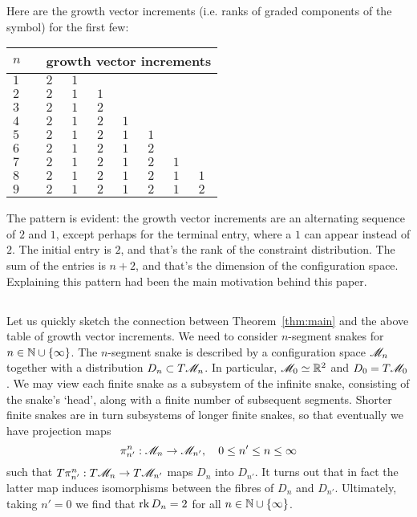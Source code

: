 Here are the growth vector increments (i.e. ranks of graded
components of the symbol) for the first few:
\begin{center}\begin{tabular}{@{}lclllllll@{}}
        $n$ & & \multicolumn{7}{c}{growth vector increments} \\
        \midrule
        $1$ & & $2$ & $1$ \\
        $2$ & & $2$ & $1$ & $1$ \\
        $3$ & & $2$ & $1$ & $2$ \\
        $4$ & & $2$ & $1$ & $2$ & $1$ \\
        $5$ & & $2$ & $1$ & $2$ & $1$ & $1$ \\
        $6$ & & $2$ & $1$ & $2$ & $1$ & $2$ \\
        $7$ & & $2$ & $1$ & $2$ & $1$ & $2$ & $1$ \\
        $8$ & & $2$ & $1$ & $2$ & $1$ & $2$ & $1$ & $1$\\
        $9$ & & $2$ & $1$ & $2$ & $1$ & $2$ & $1$ & $2$ \\
\end{tabular}
\end{center}
The pattern is evident: the growth vector increments are an alternating
sequence of $2$ and $1$, except perhaps for the terminal entry, where
a $1$ can appear instead of $2$. The initial entry is $2$, and that's the rank
of the constraint distribution. The sum of the entries is $n+2$, and that's the
dimension of the configuration space. Explaining this pattern had been the main
motivation behind this paper.

\subsection{}
Let us quickly sketch the connection between Theorem~\ref{thm:main} and the above table
of growth vector increments. We need to consider $n$-segment snakes for $n \in {\mathbb{N}} \cup \{\infty\}$.
The $n$-segment snake is described by a configuration space $\mathscr{M}_n$ together with a distribution
$D_n \subset T\mathscr{M}_n$. In particular, $\mathscr{M}_0 \simeq {\mathbb{R}}^2$ and $D_0 = T\mathscr{M}_0$.
We may view each finite snake as a subsystem of the infinite snake,
consisting of the snake's `head', along with a finite number of subsequent segments. Shorter finite
snakes are in turn subsystems of longer finite snakes, so that eventually we have projection maps
\[ \pi^n_{n'} : \mathscr{M}_n \to \mathscr{M}_{n'},\quad 0 \le n' \le n \le \infty \]
such that $T\pi^n_{n'} : T\mathscr{M}_n \to T\mathscr{M}_{n'}$ maps $D_n$ into $D_{n'}$. 
It turns out that in fact the latter map induces isomorphisms between the fibres of $D_n$ and $D_{n'}$.
Ultimately, taking $n'=0$ we find that $\operatorname{\mathrm{rk}} D_n = 2$ for all $n \in {\mathbb{N}} \cup \{\infty\}$.

